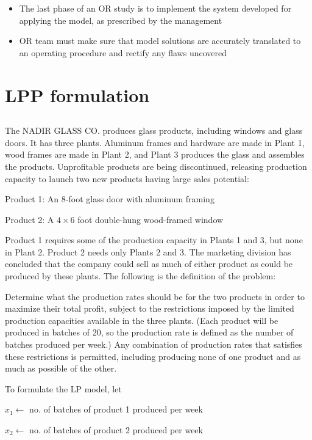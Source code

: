 \documentclass[12pt]{article}
\begin{document}
\begin{itemize}
\item The last phase of an OR study is to implement the system developed for applying the model, as prescribed by the management
\item OR team must make sure that model solutions are accurately translated to an operating procedure and rectify any flaws uncovered
\end{itemize}


\section{LPP formulation}
\label{sec-1}
\subsection{}

The NADIR GLASS CO. produces glass products, including windows and
glass doors. It has three plants. Aluminum frames and hardware are made in Plant 1, wood
frames are made in Plant 2, and Plant 3 produces the glass and assembles the products.
Unprofitable products are being discontinued, releasing production capacity
to launch two new products having large sales potential:

Product 1: An 8-foot glass door with aluminum framing

Product 2: A $4 \times 6$ foot double-hung wood-framed window

Product 1 requires some of the production capacity in Plants 1 and 3, but none in Plant 2.
Product 2 needs only Plants 2 and 3. The marketing division has concluded that the company could sell as much of either product as could be produced by these plants. 
The following is the definition of the problem:

Determine what the production rates should be for the two products in order to maximize
their total profit, subject to the restrictions imposed by the limited production capacities
available in the three plants. (Each product will be produced in batches of 20, so the 
production rate is defined as the number of batches produced per week.) Any combination
of production rates that satisfies these restrictions is permitted, including producing none
of one product and as much as possible of the other.

To formulate the LP model, let

$x_1 \gets$ no. of batches of product 1 produced per week 

$x_2 \gets$ no. of batches of product 2 produced per week 
\end{document}
